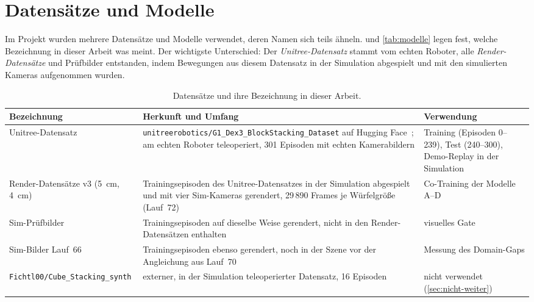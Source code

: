 \section{Datensätze und Modelle}
\label{sec:daten-modelle}

Im Projekt wurden mehrere Datensätze und Modelle verwendet, deren Namen sich teils ähneln.
 und \cref{tab:modelle} legen fest, welche Bezeichnung in dieser Arbeit
was meint. Der wichtigste Unterschied: Der \emph{Unitree-Datensatz} stammt vom echten Roboter,
alle \emph{Render-Datensätze} und Prüfbilder entstanden, indem Bewegungen aus diesem Datensatz
in der Simulation abgespielt und mit den simulierten Kameras aufgenommen wurden.

\begin{table}[htb]
  \centering
  \small
  \begin{tabularx}{\linewidth}{>{\raggedright\arraybackslash}p{2.9cm}>{\raggedright\arraybackslash}X>{\raggedright\arraybackslash}p{4.0cm}}
    \toprule
    Bezeichnung & Herkunft und Umfang & Verwendung \\
    \midrule
    Unitree-Datensatz & \texttt{unitreerobotics/}\allowbreak\texttt{G1\_Dex3\_BlockStacking\_\allowbreak Dataset} auf Hugging
      Face~\cite{g1dex3dataset}; am echten Roboter teleoperiert, 301 Episoden mit echten
      Kamerabildern & Training (Episoden 0--239), Test (240--300), Demo-Replay in der
      Simulation \\
    \addlinespace
    Render-Datensätze v3 (5~cm, 4~cm) & 187 Trainingsepisoden des Unitree-Datensatzes in der
      Simulation abgespielt und mit vier Sim-Kameras gerendert, 29\,890 Frames je Würfelgröße
      (Lauf~72) & Co-Training der Modelle A--D \\
    \addlinespace
    Sim-Prüfbilder & 4 Trainingsepisoden auf dieselbe Weise gerendert, nicht in den
      Render-Datensätzen enthalten & visuelles Gate \\
    \addlinespace
    Sim-Bilder Lauf~66 & 8 Trainingsepisoden ebenso gerendert, noch in der Szene vor
      der Angleichung aus Lauf~70 & Messung des Domain-Gaps \\
    \addlinespace
    \texttt{Fichtl00/}\allowbreak\texttt{Cube\_Stacking\_\allowbreak synth} & externer, in der Simulation teleoperierter
      Datensatz, 16 Episoden & nicht verwendet (\cref{sec:nicht-weiter}) \\
    \bottomrule
  \end{tabularx}
  \caption{Datensätze und ihre Bezeichnung in dieser Arbeit.}
  \label{tab:datensaetze}
\end{table}

